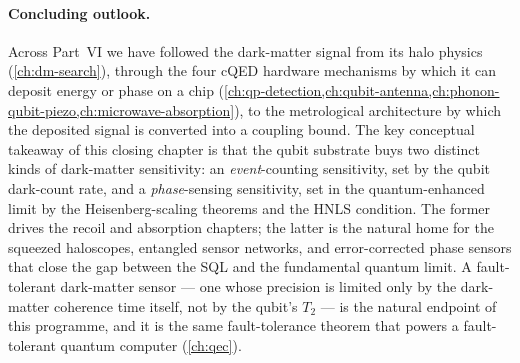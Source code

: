 \paragraph{Concluding outlook.}
Across Part~VI we have followed the dark-matter signal from
its halo physics (\cref{ch:dm-search}), through the
four cQED hardware mechanisms by which it can deposit energy
or phase on a chip
(\cref{ch:qp-detection,ch:qubit-antenna,ch:phonon-qubit-piezo,ch:microwave-absorption}),
to the metrological architecture by which the deposited signal
is converted into a coupling bound. The key conceptual
takeaway of this closing chapter is that the qubit substrate
buys two distinct kinds of dark-matter sensitivity: an
\emph{event}-counting sensitivity, set by the qubit dark-count
rate, and a \emph{phase}-sensing sensitivity, set in the
quantum-enhanced limit by the Heisenberg-scaling theorems and
the HNLS condition. The former drives the recoil and absorption
chapters; the latter is the natural home for the squeezed
haloscopes, entangled sensor networks, and error-corrected
phase sensors that close the gap between the SQL and the
fundamental quantum limit. A fault-tolerant
dark-matter sensor --- one whose precision is limited only by
the dark-matter coherence time itself, not by the qubit's
$T_2$ --- is the natural endpoint of this programme, and
it is the same fault-tolerance theorem that powers a
fault-tolerant quantum computer
(\cref{ch:qec}).
